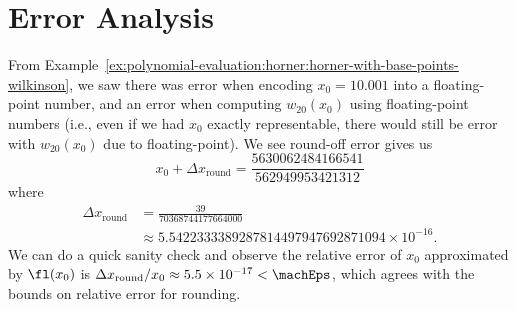 \section{Error Analysis}

From
Example~\ref{ex:polynomial-evaluation:horner:horner-with-base-points-wilkinson},
we saw there was error when encoding $x_{0}=10.001$ into a floating-point
number, and an error when computing $w_{20}(x_{0})$ using floating-point
numbers (i.e., even if we had $x_{0}$ exactly representable, there would
still be error with $w_{20}(x_{0})$ due to floating-point). We see
round-off error gives us
\begin{equation}
  x_{0} + \Delta x_{\text{round}} = \frac{5630062484166541}{562949953421312}
\end{equation}
where
\begin{equation}
  \begin{split}
    \Delta x_{\text{round}} &= \frac{39}{70368744177664000}\\
    &\approx5.5422333389287814497947692871094 \times10^{-16}.
  \end{split}
\end{equation}
We can do a quick sanity check and observe the relative error of $x_{0}$
approximated by $\fl(x_{0})$ is $\Delta x_{\text{round}}/x_{0}\approx 5.5\times10^{-17}<\machEps$,
which agrees with the bounds on relative error for rounding.

